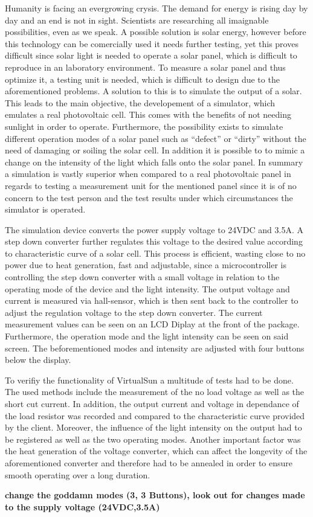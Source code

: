 \documentclass[a4paper]{fhnwreport}
\begin{document}
Humanity is facing an evergrowing crysis. The demand for energy is rising day by day and an end is not in sight. Scientists are researching all imaignable possibilities, even as we speak. A possible solution is solar energy, however before this technology can be comercially used it needs further testing, yet this proves difficult since solar light is needed to operate a solar panel, which is difficult to reproduce in an laboratory environment. To measure a solar panel and thus optimize it, a testing unit is needed, which is difficult to design due to the aforementioned problems. A solution to this is to simulate the output of a solar. This leads to the main objective, the developement of a simulator, which emulates a real photovoltaic cell. This comes with the benefits of not needing sunlight in order to operate. Furthermore, the possibility exists to simulate different operation modes of a solar panel such as ``defect'' or ``dirty'' without the need of damaging or soiling the solar cell. In addition it is possible to to mimic a change on the intensity of the light which falls onto the solar panel. In summary a simulation is vastly superior when compared to a real photovoltaic panel in regards to testing a measurement unit for the mentioned panel since it is of no concern to the test person and the test results under which circumstances the simulator is operated. 

The simulation device converts the power supply voltage to 24VDC and 3.5A. A step down converter further regulates this voltage to the desired value according to characteristic curve of a solar cell. This process is efficient, wasting close to no power due to heat generation, fast and adjustable, since a microcontroller is controlling the step down converter with a small voltage in relation to the operating mode of the device and the light intensity. The output voltage and current is measured via hall-sensor, which is then sent back to the controller to adjust the regulation voltage to the step down converter. The current measurement values can be seen on an LCD Diplay at the front of the package. Furthermore, the operation mode and the light intensity can be seen on said screen. The beforementioned modes and intensity are adjusted with four buttons below the display. 

To verifiy the functionality of VirtualSun a multitude of tests had to be done. The used methods include the measurement of the no load voltage as well as the short cut current. In addition, the output current and voltage in dependance of the load resistor was recorded and compared to the characteristic curve provided by the client.  Moreover, the influence of the light intensity on the output had to be registered as well as the two operating modes. Another important factor was the heat generation of the voltage converter, which can affect the longevity of the aforementioned converter and therefore had to be annealed in order to ensure smooth operating over a long duration.

\bf{change the goddamn modes (3, 3 Buttons), look out for changes made to the supply voltage (24VDC,3.5A)} 
\end{document}
